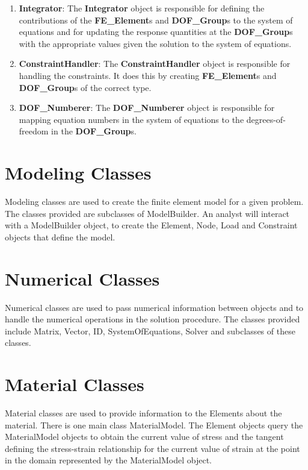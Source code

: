 \begin{enumerate}
\item {\bf Integrator}: The {\bf Integrator} object is responsible for
defining the contributions of the {\bf FE\_Element}s and {\bf
DOF\_Group}s to the system of equations and for updating the response
quantities at the {\bf DOF\_Group}s with the appropriate values given
the solution to the system of equations. 

\item {\bf ConstraintHandler}: The {\bf ConstraintHandler} object is
responsible for handling the constraints. It does this by creating
{\bf FE\_Element}s and {\bf DOF\_Group}s of the correct type.

\item {\bf DOF\_Numberer}: The {\bf DOF\_Numberer} object is
responsible for mapping equation numbers in the system of equations to
the degrees-of-freedom in the {\bf DOF\_Group}s. 

\end{enumerate}

\pagebreak


\pagebreak
\section{Modeling Classes}
Modeling classes are used to create the finite element model for a
given problem. The classes provided are subclasses of ModelBuilder. An
analyst will interact with a ModelBuilder object, to create the
Element, Node, Load and Constraint objects that define the 
model. 

\pagebreak


\pagebreak
\section{Numerical Classes}
Numerical classes are used to pass numerical information between
objects and to handle the numerical operations in the solution
procedure. The classes provided include Matrix, Vector, ID,
SystemOfEquations, Solver and subclasses of these classes.




\pagebreak
\section{Material Classes}

Material classes are used to provide information to the Elements about
the material. There is one main class MaterialModel. The Element
objects query the MaterialModel objects to obtain the current value of
stress and the tangent defining the stress-strain relationship for the
current value of strain at the point in the domain represented by the
MaterialModel object.  


